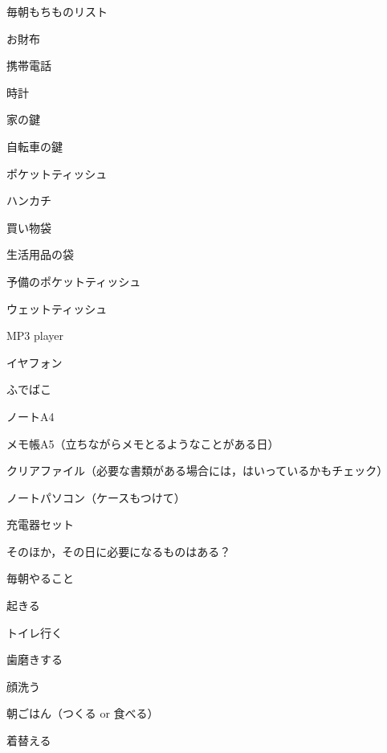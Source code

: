 \documentclass[a4paper,11pt]{jsarticle}
\begin{document}
毎朝もちものリスト
\begin{todolist}
	\item お財布
	\item 携帯電話
	\item 時計
	\item 家の鍵
	\item 自転車の鍵
	\item ポケットティッシュ
	\item ハンカチ
	\item 買い物袋
	\item 生活用品の袋
	\begin{todolist}
		\item 予備のポケットティッシュ
		\item ウェットティッシュ
		\item MP3 player
		\item イヤフォン
	\end{todolist}
	\item ふでばこ
	\item ノートA4
	\item メモ帳A5（立ちながらメモとるようなことがある日）
	\item クリアファイル（必要な書類がある場合には，はいっているかもチェック）
	\item ノートパソコン（ケースもつけて）
	\item 充電器セット
	\item そのほか，その日に必要になるものはある？
\end{todolist}

毎朝やること
\begin{todolist}
	\item 起きる
	\item トイレ行く
	\item 歯磨きする
	\item 顔洗う
	\item 朝ごはん（つくる or 食べる）
	\item 着替える
\end{todolist}
\end{document}
